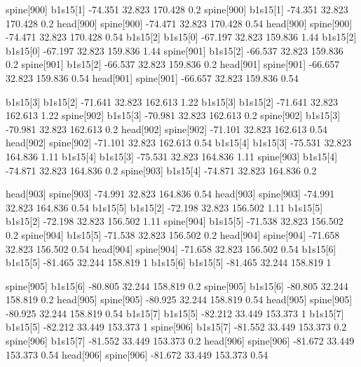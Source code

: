 spine[900]    b1s15[1]    -74.351    32.823    170.428    0.2
spine[900]    b1s15[1]    -74.351    32.823    170.428    0.2
head[900]    spine[900]    -74.471    32.823    170.428    0.54
head[900]    spine[900]    -74.471    32.823    170.428    0.54
b1s15[2]    b1s15[0]    -67.197    32.823    159.836    1.44
b1s15[2]    b1s15[0]    -67.197    32.823    159.836    1.44
spine[901]    b1s15[2]    -66.537    32.823    159.836    0.2
spine[901]    b1s15[2]    -66.537    32.823    159.836    0.2
head[901]    spine[901]    -66.657    32.823    159.836    0.54
head[901]    spine[901]    -66.657    32.823    159.836    0.54


b1s15[3]    b1s15[2]    -71.641    32.823    162.613    1.22
b1s15[3]    b1s15[2]    -71.641    32.823    162.613    1.22
spine[902]    b1s15[3]    -70.981    32.823    162.613    0.2
spine[902]    b1s15[3]    -70.981    32.823    162.613    0.2
head[902]    spine[902]    -71.101    32.823    162.613    0.54
head[902]    spine[902]    -71.101    32.823    162.613    0.54
b1s15[4]    b1s15[3]    -75.531    32.823    164.836    1.11
b1s15[4]    b1s15[3]    -75.531    32.823    164.836    1.11
spine[903]    b1s15[4]    -74.871    32.823    164.836    0.2
spine[903]    b1s15[4]    -74.871    32.823    164.836    0.2


head[903]    spine[903]    -74.991    32.823    164.836    0.54
head[903]    spine[903]    -74.991    32.823    164.836    0.54
b1s15[5]    b1s15[2]    -72.198    32.823    156.502    1.11
b1s15[5]    b1s15[2]    -72.198    32.823    156.502    1.11
spine[904]    b1s15[5]    -71.538    32.823    156.502    0.2
spine[904]    b1s15[5]    -71.538    32.823    156.502    0.2
head[904]    spine[904]    -71.658    32.823    156.502    0.54
head[904]    spine[904]    -71.658    32.823    156.502    0.54
b1s15[6]    b1s15[5]    -81.465    32.244    158.819    1
b1s15[6]    b1s15[5]    -81.465    32.244    158.819    1


spine[905]    b1s15[6]    -80.805    32.244    158.819    0.2
spine[905]    b1s15[6]    -80.805    32.244    158.819    0.2
head[905]    spine[905]    -80.925    32.244    158.819    0.54
head[905]    spine[905]    -80.925    32.244    158.819    0.54
b1s15[7]    b1s15[5]    -82.212    33.449    153.373    1
b1s15[7]    b1s15[5]    -82.212    33.449    153.373    1
spine[906]    b1s15[7]    -81.552    33.449    153.373    0.2
spine[906]    b1s15[7]    -81.552    33.449    153.373    0.2
head[906]    spine[906]    -81.672    33.449    153.373    0.54
head[906]    spine[906]    -81.672    33.449    153.373    0.54


